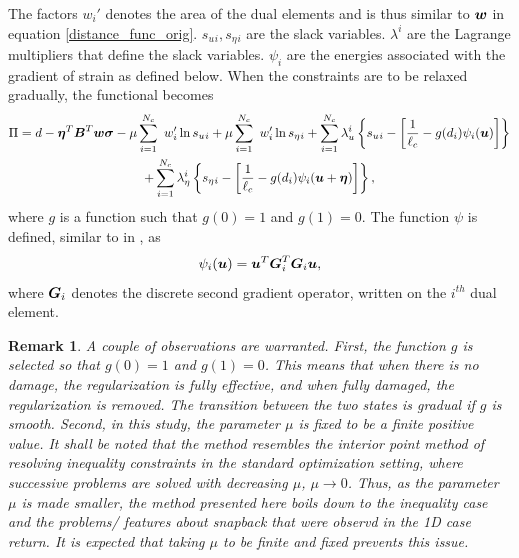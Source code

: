 \documentclass[11pt]{elsarticle}
\newtheorem*{remark}{Remark}
\begin{document}
The factors $ w_i'$ denotes the area of the dual elements and is thus similar to $ \mbox{\boldmath $w$}$ in equation \ref{distance_func_orig}. $s_u{_i},s_\eta{_i}$ are the slack variables. $\lambda^i$ are the Lagrange multipliers that define the slack variables. $\psi_i$ are the energies associated with the gradient of strain as defined below. When the constraints are to be relaxed gradually, the functional becomes
\begin{multline}
	\Pi  = d -\mbox{\boldmath $\eta$} ^T \mbox{\boldmath $B$}^T \mbox{\boldmath $w$} \mbox{\boldmath $\sigma$} - \mu \sum_{i=1}^{N_c} \
	w_i' \ln s_u{_i} + \mu \sum_{i=1}^{N_c} \
	w_i' \ln s_\eta{_i} +\sum_{i=1}^{N_c} \lambda_u^ i \left\{ s_u{_i}  - \left[ \frac{1}{\ell_c}- g(d_i)\psi_i(\mbox{\boldmath $u$}) \right]  \right\} \\
	+\sum_{i=1}^{N_c} \lambda_\eta^ i \left\{ s_\eta{_i}  - \left[ \frac{1}{\ell_c}-g(d_i) \psi_i(\mbox{\boldmath $u$}+\mbox{\boldmath $\eta$}) \right]  \right\},
\end{multline}
where $g$ is a function such that $g(0)=1$ and $g(1)=0$. The function $\psi$ is defined, similar to in \cite{Mindlin1968}, as 
\begin{equation}
	\psi_i(\mbox{\boldmath $u$} ) = \mbox{\boldmath $u$} ^T \mbox{\boldmath $G$}_i ^T \mbox{\boldmath $G$}_i \mbox{\boldmath $u$},
\end{equation}
where $\mbox{\boldmath $G$}_i$ denotes the discrete second gradient operator, written on the $i^{th}$ dual element.

\begin{remark}
	A couple of observations are warranted. First, the function $g$ is selected so that $g(0)=1$ and $g(1)=0$. This means that when there is no damage, the regularization is fully effective, and when fully damaged, the regularization is removed. The transition between the two states is gradual if $g$ is smooth. Second, in this study, the parameter $\mu$ is fixed to be a finite positive value. It shall be noted that the method resembles the interior point method of resolving inequality constraints in the standard optimization setting, where successive problems are solved with decreasing $\mu$, $\mu \to 0$. Thus, as the parameter $\mu$ is made smaller, the method presented here boils down to the inequality case and the problems/ features about snapback that were observd in the 1D case return. It is expected that taking $\mu$ to be finite and fixed prevents this issue. 
\end{remark}
\end{document}
